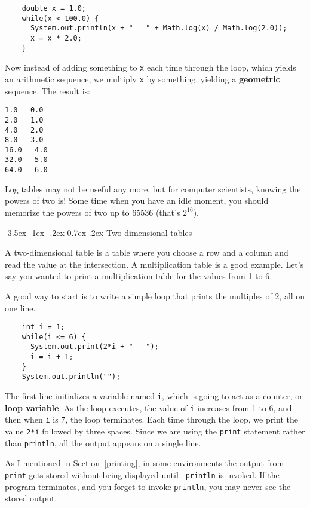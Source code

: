 \documentclass{book}
\makeatletter
\renewcommand{\section}{\@startsection 
    {section} {1} {0mm}%
    {-3.5ex \@plus -1ex \@minus -.2ex}%
    {0.7ex \@plus.2ex}%
    {\normalfont\Large\bfseries}}
\makeatother
\begin{document}
\begin{verbatim}
    double x = 1.0;
    while(x < 100.0) {
      System.out.println(x + "   " + Math.log(x) / Math.log(2.0));
      x = x * 2.0;
    }
\end{verbatim}
%
Now instead of adding something to {\tt x} each time through
the loop, which yields an arithmetic sequence, we multiply
{\tt x} by something, yielding a {\bf geometric} sequence.
The result is:

\begin{verbatim}
1.0   0.0
2.0   1.0
4.0   2.0
8.0   3.0
16.0   4.0
32.0   5.0
64.0   6.0
\end{verbatim}
%
Log tables may not be useful any more, but for computer scientists,
knowing the powers of two is!  Some time when you have an idle
moment, you should memorize the powers of two up to 65536
(that's $2^{16}$).

\section{Two-dimensional tables}

A two-dimensional table is a table where you choose a row and
a column and read the value at the intersection.  A multiplication
table is a good example.  Let's say you wanted to print a
multiplication table for the values from 1 to 6.

A good way to start is to write a simple loop that prints
the multiples of 2, all on one line.

\begin{verbatim}
    int i = 1;
    while(i <= 6) {
      System.out.print(2*i + "   ");
      i = i + 1;
    }
    System.out.println("");
\end{verbatim}
%
The first line initializes a variable named {\tt i}, which is
going to act as a counter, or {\bf loop variable}.  As the
loop executes, the value of {\tt i} increases from 1 to 6,
and then when {\tt i} is 7, the loop terminates.  Each
time through the loop, we print the value {\tt 2*i} followed
by three spaces.  Since we are using the {\tt print} statement
rather than {\tt println}, all the output appears on a single
line.


As I mentioned in Section~\ref{printing}, in some environments the
output from {\tt print} gets stored without being displayed until {\tt
println} is invoked.  If the program terminates, and you forget to
invoke {\tt println}, you may never see the stored output.
\end{document}
